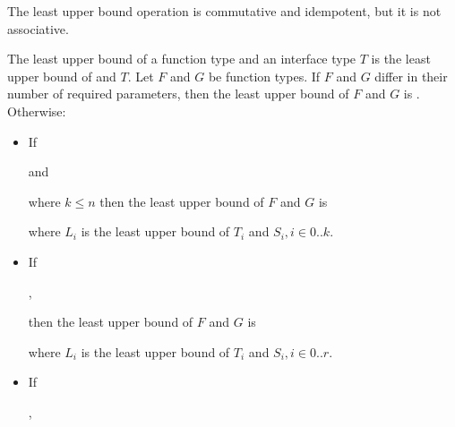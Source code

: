 \documentclass[makeidx]{article}
\begin{document}
{\LMHash{}%
The least upper bound operation is commutative and idempotent,
but it is not associative.



\LMHash{}%
The least upper bound of a function type and an interface type $T$ is
the least upper bound of \FUNCTION{} and $T$.
Let $F$ and $G$ be function types.
If $F$ and $G$ differ in their number of required parameters,
then the least upper bound of $F$ and $G$ is \FUNCTION.
Otherwise:
\begin{itemize}
\item If

\noindent
{} and

\noindent
{}

\noindent
where $k \le n$ then the least upper bound of $F$ and $G$ is

\noindent
{}

\noindent
where $L_i$ is the least upper bound of $T_i$ and $S_i, i \in 0 .. k$.
\item If

\noindent
{},

\noindent
{}

\noindent
then the least upper bound of $F$ and $G$ is

\noindent
{}

\noindent
where $L_i$ is the least upper bound of $T_i$ and $S_i, i \in 0 .. r$.
\item If

\noindent
{},

\noindent
{}


\end{itemize}}
\end{document}
